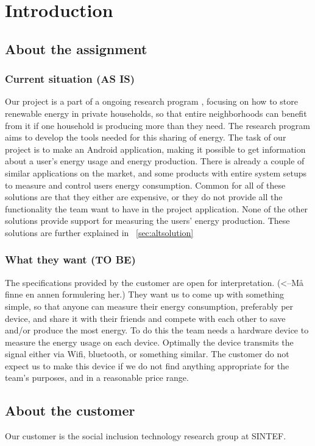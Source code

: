 \chapter{Introduction}

\section{About the assignment}
\subsection{Current situation (AS IS)}
Our project is a part of a ongoing research program \cite{cossmic}, focusing on how to store renewable energy in private households, so that entire neighborhoods can benefit from it if one household is producing more than they need. The research program aims to develop the tools needed for this sharing of energy. The task of our project is to make an Android application, making it possible to get information about a user's energy usage and energy production. There is already a couple of similar applications on the market, and some products with entire system setups to measure and control users energy consumption. Common for all of these solutions are that they either are expensive, or they do not provide all the functionality the team want to have in the project application. None of the other solutions provide support for measuring the users' energy production. These solutions are further explained in ~\ref{sec:altsolution}

\subsection{What they want (TO BE)}
The specifications provided by the customer are open for interpretation. (<--Må finne en annen formulering her.) They want us to come up with something simple, so that anyone can measure their energy consumption, preferably per device, and share it with their friends and compete with each other to save and/or produce the most energy. To do this the team needs a hardware device to measure the energy usage on each device. Optimally the device transmits the signal either via Wifi, bluetooth, or something similar. The customer do not expect us to make this device if we do not find anything appropriate for the team's purposes, and in a reasonable price range.

\section{About the customer}

Our customer is the social inclusion technology research group at SINTEF. \cite{sintef}








 


